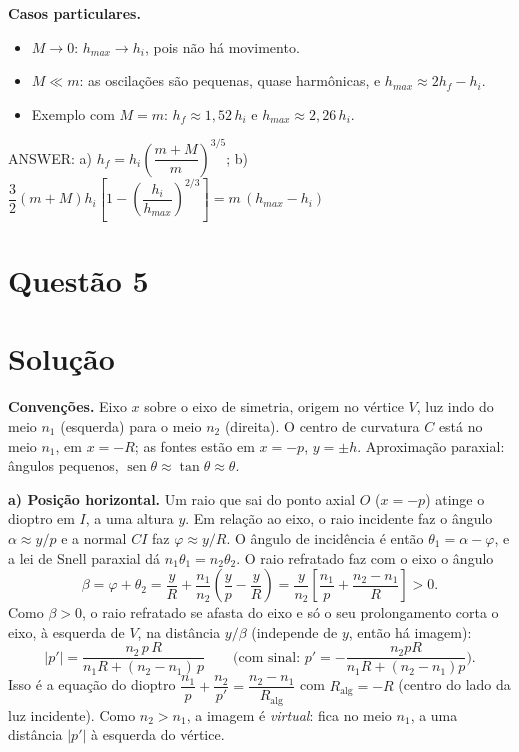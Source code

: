 \documentclass{article}%
\begin{document}
\textbf{Casos particulares.}
\begin{itemize}
\item $M\to 0$: $h_{max}\to h_i$, pois não há movimento.
\item $M\ll m$: as oscilações são pequenas, quase harmônicas, e $h_{max}\approx 2h_f-h_i$.
\item Exemplo com $M=m$: $h_f\approx 1{,}52\,h_i$ e $h_{max}\approx 2{,}26\,h_i$.
\end{itemize}

ANSWER: a) $h_f=h_i\left(\dfrac{m+M}{m}\right)^{3/5}$; b) $\dfrac32(m+M)h_i\left[1-\left(\dfrac{h_i}{h_{max}}\right)^{2/3}\right]=m\,(h_{max}-h_i)$%
\newpage%
\section*{Questão 5}

\section*{Solução}

\textbf{Convenções.} Eixo $x$ sobre o eixo de simetria, origem no vértice $V$, luz indo do meio $n_1$ (esquerda) para o meio $n_2$ (direita). O centro de curvatura $C$ está no meio $n_1$, em $x=-R$; as fontes estão em $x=-p$, $y=\pm h$. Aproximação paraxial: ângulos pequenos, $\operatorname{sen}\theta\approx\tan\theta\approx\theta$.

\textbf{a) Posição horizontal.} Um raio que sai do ponto axial $O$ ($x=-p$) atinge o dioptro em $I$, a uma altura $y$. Em relação ao eixo, o raio incidente faz o ângulo $\alpha\approx y/p$ e a normal $CI$ faz $\varphi\approx y/R$. O ângulo de incidência é então $\theta_1=\alpha-\varphi$, e a lei de Snell paraxial dá $n_1\theta_1=n_2\theta_2$. O raio refratado faz com o eixo o ângulo
\[
\beta=\varphi+\theta_2=\frac{y}{R}+\frac{n_1}{n_2}\left(\frac{y}{p}-\frac{y}{R}\right)=\frac{y}{n_2}\left[\frac{n_1}{p}+\frac{n_2-n_1}{R}\right]>0 .
\]
Como $\beta>0$, o raio refratado se afasta do eixo e só o seu prolongamento corta o eixo, à esquerda de $V$, na distância $y/\beta$ (independe de $y$, então há imagem):
\[
|p'|=\frac{n_2\,p\,R}{n_1R+(n_2-n_1)\,p}
\qquad\Big(\text{com sinal: } p'=-\frac{n_2pR}{n_1R+(n_2-n_1)p}\Big).
\]
Isso é a equação do dioptro $\dfrac{n_1}{p}+\dfrac{n_2}{p'}=\dfrac{n_2-n_1}{R_{\text{alg}}}$ com $R_{\text{alg}}=-R$ (centro do lado da luz incidente). Como $n_2>n_1$, a imagem é \emph{virtual}: fica no meio $n_1$, a uma distância $|p'|$ à esquerda do vértice.
\end{document}
